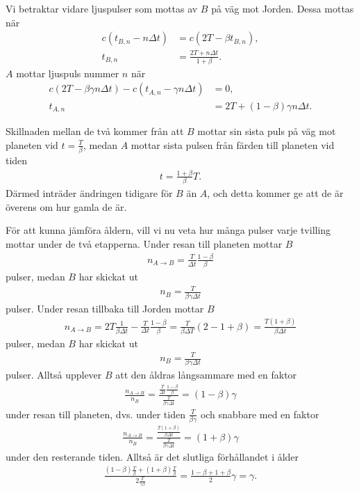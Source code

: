 Vi betraktar vidare ljuspulser som mottas av $B$ på väg mot Jorden. Dessa mottas när
\begin{align*}
	c(t_{B, n} - n\Delta t) &= c(2T - \beta t_{B, n}), \\
	t_{B, n}                &= \frac{2T + n\Delta t}{1 + \beta}.
\end{align*}
$A$ mottar ljuspuls nummer $n$ när
\begin{align*}
	c(2T - \beta\gamma n\Delta t) - c(t_{A, n} - \gamma n\Delta t) &= 0, \\
	t_{A, n}                                                        &= 2T + (1 - \beta)\gamma n\Delta t.
\end{align*}

Skillnaden mellan de två kommer från att $B$ mottar sin sista puls på väg mot planeten vid $t = \frac{T}{\beta}$, medan $A$ mottar sista pulsen från färden till planeten vid tiden
\begin{align*}
	t = \frac{1 + \beta}{\beta}T.
\end{align*}
Därmed inträder ändringen tidigare för $B$ än $A$, och detta kommer ge att de är överens om hur gamla de är.

För att kunna jämföra åldern, vill vi nu veta hur många pulser varje tvilling mottar under de två etapperna. Under resan till planeten mottar $B$
\begin{align*}
	n_{A\to B} = \frac{T}{\Delta t}\frac{1 - \beta}{\beta}
\end{align*}
pulser, medan $B$ har skickat ut
\begin{align*}
	n_{B} = \frac{T}{\beta\gamma\Delta t}
\end{align*}
pulser. Under resan tillbaka till Jorden mottar $B$
\begin{align*}
	n_{A\to B} = 2T\frac{1}{\beta\Delta t} - \frac{T}{\Delta t}\frac{1 - \beta}{\beta} = \frac{T}{\beta\Delta T}(2 - 1 + \beta) = \frac{T(1 + \beta)}{\beta\Delta t}
\end{align*}
pulser, medan $B$ har skickat ut
\begin{align*}
	n_{B} = \frac{T}{\beta\gamma\Delta t}
\end{align*}
pulser. Alltså upplever $B$ att den åldras långsammare med en faktor
\begin{align*}
	\frac{n_{A\to B}}{n_{B}} = \frac{\frac{T}{\Delta t}\frac{1 - \beta}{\beta}}{\frac{T}{\beta\gamma\Delta t}} = (1 - \beta)\gamma
\end{align*}
under resan till planeten, dvs. under tiden $\frac{T}{\beta\gamma}$ och snabbare med en faktor
\begin{align*}
	\frac{n_{A\to B}}{n_{B}} = \frac{\frac{T(1 + \beta)}{\beta\Delta t}}{\frac{T}{\beta\gamma\Delta t}} = (1 + \beta)\gamma
\end{align*}
under den resterande tiden. Alltså är det slutliga förhållandet i ålder
\begin{align*}
	\frac{(1 - \beta)\frac{T}{\beta} + (1 + \beta)\frac{T}{\beta}}{2\frac{T}{\gamma\beta}} = \frac{1 - \beta + 1 + \beta}{2}\gamma = \gamma.
\end{align*}

